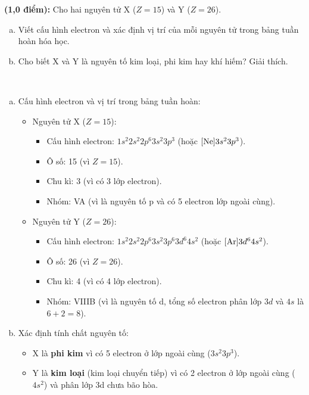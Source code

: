 \documentclass[12pt,a4paper]{article}
\renewcommand{\loigiai}[1]{%
  \par\smallskip\noindent{\color{blue!80!black}\textbf{Lời giải:}}\ #1\par\smallskip
}
\begin{document}
\begin{ex}
\textbf{(1,0 điểm):} Cho hai nguyên tử X ($Z = 15$) và Y ($Z = 26$).
\begin{enumerate}[a)]
	\item Viết cấu hình electron và xác định vị trí của mỗi nguyên tử trong bảng tuần hoàn hóa học.
	\item Cho biết X và Y là nguyên tố kim loại, phi kim hay khí hiếm? Giải thích.
\end{enumerate}

\loigiai{
\begin{enumerate}[a)]
	\item Cấu hình electron và vị trí trong bảng tuần hoàn:
	\begin{itemize}
		\item Nguyên tử X ($Z = 15$):
		\begin{itemize}
			\item Cấu hình electron: $1s^2 2s^2 2p^6 3s^2 3p^3$ (hoặc $[\ce{Ne}]3s^2 3p^3$).
			\item Ô số: 15 (vì $Z = 15$).
			\item Chu kì: 3 (vì có 3 lớp electron).
			\item Nhóm: VA (vì là nguyên tố p và có 5 electron lớp ngoài cùng).
		\end{itemize}
		\item Nguyên tử Y ($Z = 26$):
		\begin{itemize}
			\item Cấu hình electron: $1s^2 2s^2 2p^6 3s^2 3p^6 3d^6 4s^2$ (hoặc $[\ce{Ar}]3d^6 4s^2$).
			\item Ô số: 26 (vì $Z = 26$).
			\item Chu kì: 4 (vì có 4 lớp electron).
			\item Nhóm: VIIIB (vì là nguyên tố d, tổng số electron phân lớp $3d$ và $4s$ là $6 + 2 = 8$).
		\end{itemize}
	\end{itemize}
	\item Xác định tính chất nguyên tố:
	\begin{itemize}
		\item X là \textbf{phi kim} vì có 5 electron ở lớp ngoài cùng ($3s^2 3p^3$).
		\item Y là \textbf{kim loại} (kim loại chuyển tiếp) vì có 2 electron ở lớp ngoài cùng ($4s^2$) và phân lớp 3d chưa bão hòa.
	\end{itemize}
\end{enumerate}
}
\end{ex}
\end{document}
